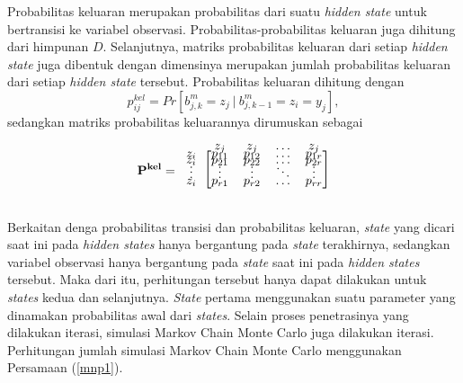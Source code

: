 Probabilitas keluaran merupakan probabilitas dari suatu \textit{hidden state} untuk bertransisi ke variabel observasi. Probabilitas-probabilitas keluaran juga dihitung dari himpunan $D$. Selanjutnya, matriks probabilitas keluaran dari setiap \textit{hidden state} juga dibentuk dengan dimensinya merupakan jumlah probabilitas keluaran dari setiap \textit{hidden state} tersebut. Probabilitas keluaran dihitung dengan
\begin{equation}
p^{kel}_{ij}=Pr[b^m_{j,k}=z_j\ |\ \mathit{b^m_{j,k-\text{1}}}=z_i=y_j]\label{probkel},
\end{equation}
sedangkan matriks probabilitas keluarannya dirumuskan sebagai
\[\mathbf{P^{kel}}=
\begin{blockarray}{ccccc}
	&z_{j}&z_{j}&\dots&z_{j}\\[-6pt]
	\begin{block}{c[cccc]}
	z_{i}&p_{11}&p_{12}&\dots&p_{1r}\\[-7pt]
	z_{i}&p_{21}&p_{22}&\dots&p_{2r}\\[-7pt]
	\vdots&\vdots&\vdots&\ddots&\vdots\\[-7pt]
	z_{i}&p_{r1}&p_{r2}&\dots&p_{rr}\\[3pt]
 	\end{block}
\end{blockarray}	
\]

Berkaitan denga probabilitas transisi dan probabilitas keluaran, \textit{state} yang dicari saat ini pada \textit{hidden states} hanya bergantung pada \textit{state} terakhirnya, sedangkan variabel observasi hanya bergantung pada \textit{state} saat ini pada \textit{hidden states} tersebut. Maka dari itu, perhitungan tersebut hanya dapat dilakukan untuk \textit{states} kedua dan selanjutnya. \textit{State} pertama menggunakan suatu parameter yang dinamakan probabilitas awal dari \textit{states}. Selain proses penetrasinya yang dilakukan iterasi, simulasi Markov Chain Monte Carlo juga dilakukan iterasi. Perhitungan jumlah simulasi Markov Chain Monte Carlo menggunakan Persamaan (\ref{mnp1}). 

